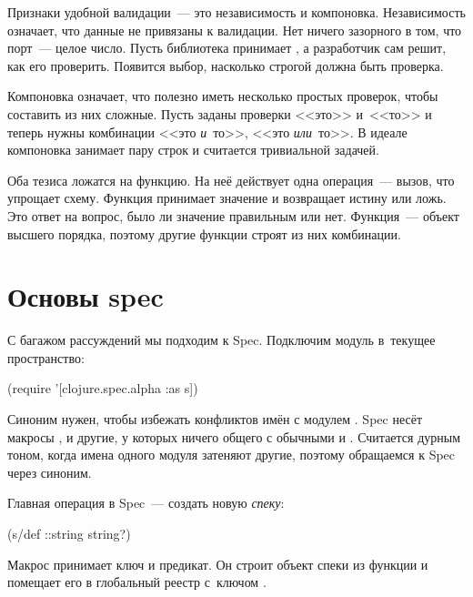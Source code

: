 
Признаки удобной валидации~--- это независимость и компоновка. Независимость
означает, что данные не привязаны к валидации. Нет ничего зазорного в том, что
порт~--- целое число. Пусть библиотека принимает , а разработчик
сам решит, как его проверить. Появится выбор, насколько строгой должна быть
проверка.


Компоновка означает, что полезно иметь несколько простых проверок, чтобы
составить из них сложные. Пусть заданы проверки <<это>> и~<<то>> и теперь нужны
комбинации <<это \emph{и}~то>>, <<это \emph{или}~то>>. В идеале компоновка
занимает пару строк и считается тривиальной задачей.


Оба тезиса ложатся на функцию. На неё действует одна операция~--- вызов, что
упрощает схему. Функция принимает значение и возвращает истину или ложь. Это
ответ на вопрос, было ли значение правильным или нет. Функция~--- объект высшего
порядка, поэтому другие функции строят из них комбинации.

\section{Основы spec}

С багажом рассуждений мы подходим к Spec. Подключим модуль в~текущее
пространство:

\begin{clojure}
(require '[clojure.spec.alpha :as s])
\end{clojure}

Синоним  нужен, чтобы избежать конфликтов имён с модулем
. Spec несёт макросы ,  и другие, у
которых ничего общего с обычными  и . Считается дурным тоном,
когда имена одного модуля затеняют другие, поэтому обращаемся к Spec через
синоним.


Главная операция в Spec~--- создать новую \emph{спеку}:

\begin{clojure}
(s/def ::string string?)
\end{clojure}


Макрос  принимает ключ и предикат. Он строит объект спеки из
функции  и помещает его в глобальный реестр с~ключом
.

